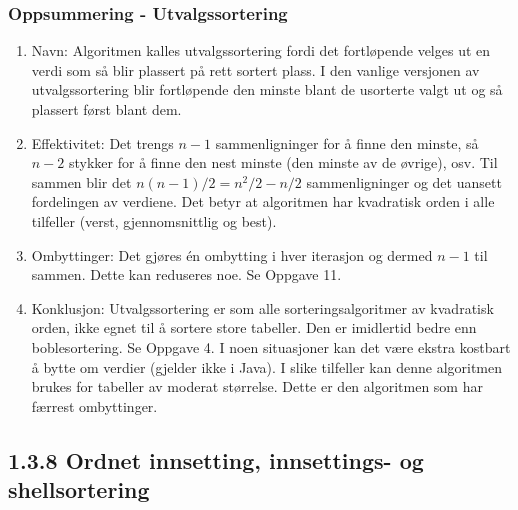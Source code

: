 \documentclass[11pt]{article}
\begin{document}
        \subsubsection{Oppsummering - Utvalgssortering}
            \begin{enumerate}
                \item Navn: Algoritmen kalles utvalgssortering fordi det fortløpende velges ut en verdi
                    som så blir plassert på rett sortert plass. I den vanlige versjonen av utvalgssortering
                    blir fortløpende den minste blant de usorterte valgt ut og så plassert først blant dem.
                \item Effektivitet: Det trengs $n - 1$ sammenligninger for å finne den minste, så $n - 2$
                    stykker for å finne den nest minste (den minste av de øvrige), osv. Til sammen blir det
                    $n(n - 1)/2 = n^2/2 - n/2$ sammenligninger og det uansett fordelingen av verdiene. Det
                    betyr at algoritmen har kvadratisk orden i alle tilfeller (verst, gjennomsnittlig og best).
                \item Ombyttinger: Det gjøres én ombytting i hver iterasjon og dermed $n - 1$ til sammen.
                    Dette kan reduseres noe. Se Oppgave 11.
                \item Konklusjon: Utvalgssortering er som alle sorteringsalgoritmer av kvadratisk orden,
                    ikke egnet til å sortere store tabeller. Den er imidlertid bedre enn boblesortering. Se
                    Oppgave 4. I noen situasjoner kan det være ekstra kostbart å bytte om verdier (gjelder
                    ikke i Java). I slike tilfeller kan denne algoritmen brukes for tabeller av moderat
                    størrelse. Dette er den algoritmen som har færrest ombyttinger.
            \end{enumerate}

    \subsection{ 1.3.8 Ordnet innsetting, innsettings- og shellsortering}
\end{document}
